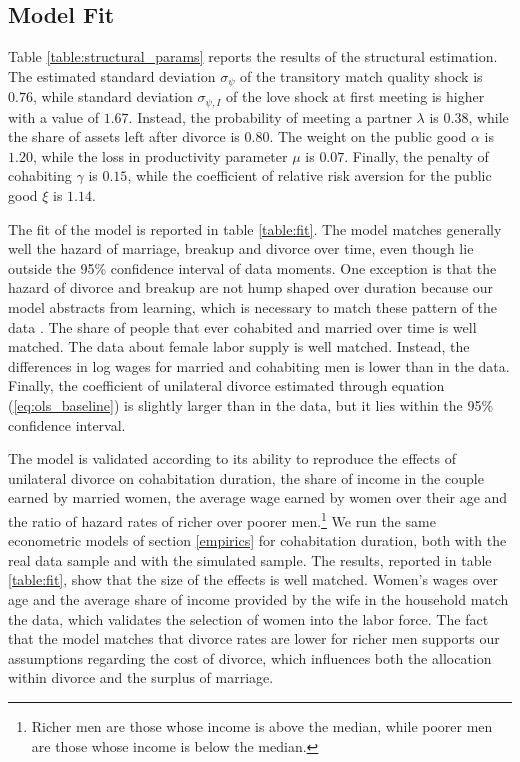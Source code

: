\documentclass[12pt]{article}
\numberwithin{table}{section}
\begin{document}
\subsection{Model Fit}
Table \ref{table:structural_params} reports the results of the structural estimation. The estimated standard deviation $\sigma_{\psi}$ of the transitory match quality shock is $0.76$, while standard deviation $\sigma_{\psi,I}$ of the love shock at first meeting is higher with a value of $1.67$. Instead, the probability of meeting a partner $\lambda$ is $0.38$, while the share of assets left after divorce is $0.80$. The weight on the public good $\alpha$ is $1.20$, while the loss in productivity parameter $\mu$ is $0.07$. Finally, the penalty of cohabiting $\gamma$ is $0.15$, while the coefficient of relative risk aversion for the public good $\xi$ is $1.14$.

The fit of the model is reported in table \ref{table:fit}. The model matches generally well the hazard of marriage, breakup and divorce over time, even though lie outside the 95\% confidence interval of data moments. One exception is that the hazard of divorce and breakup are not hump shaped over duration because our model abstracts from learning, which is necessary to match these pattern of the data \citep{blasutto2020} . The share of people that ever cohabited and married over time is well matched. The data about female labor supply is well matched. Instead, the differences in log wages for married and cohabiting men is lower than in the data. Finally, the coefficient of unilateral divorce estimated through equation (\ref{eq:ols_baseline}) is slightly larger than in the data, but it lies within the 95\% confidence interval.

The model is validated according to its ability to reproduce the effects of unilateral divorce on cohabitation duration, the share of income in the couple earned by married women, the average wage earned by women over their age and the ratio of hazard rates of richer over poorer men.\footnote{Richer men are those whose income is above the median, while poorer men are those whose income is below the median.} We run the same econometric models of section \ref{empirics} for cohabitation duration, both with the real data sample and with the simulated sample. The results, reported in table \ref{table:fit}, show that the size of the effects is well matched. Women's wages over age and the average share of income provided by the wife in the household match the data, which validates the selection of women into the labor force. The fact that the model matches that divorce rates are lower for richer men supports our assumptions regarding the cost of divorce, which influences both the allocation within divorce and the surplus of marriage.
\end{document}
